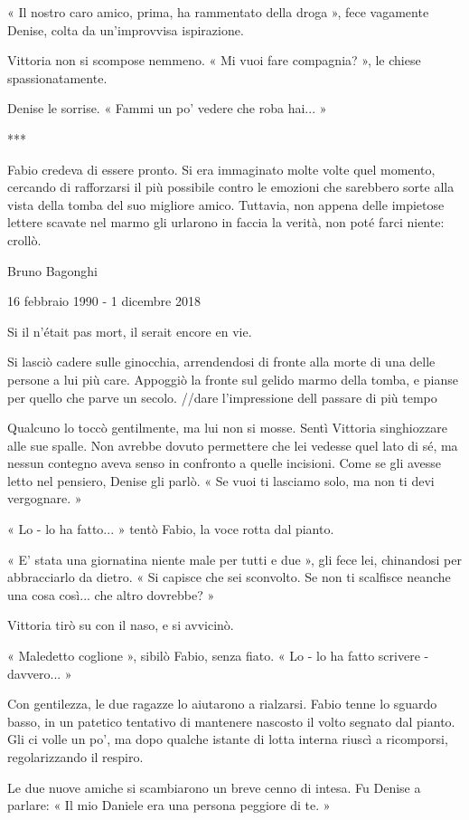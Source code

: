 « Il nostro caro amico, prima, ha rammentato della droga », fece vagamente Denise, colta da un'improvvisa ispirazione.

Vittoria non si scompose nemmeno. « Mi vuoi fare compagnia? », le chiese spassionatamente.

Denise le sorrise. « Fammi un po' vedere che roba hai... »

***

Fabio credeva di essere pronto. Si era immaginato molte volte quel momento, cercando di rafforzarsi il più possibile contro le emozioni che sarebbero sorte alla vista della tomba del suo migliore amico. Tuttavia, non appena delle impietose lettere scavate nel marmo gli urlarono in faccia la verità, non poté farci niente: crollò.

Bruno Bagonghi

16 febbraio 1990 - 1 dicembre 2018

Si il n'était pas mort, il serait encore en vie.

Si lasciò cadere sulle ginocchia, arrendendosi di fronte alla morte di una delle persone a lui più care. Appoggiò la fronte sul gelido marmo della tomba, e pianse per quello che parve un secolo. //dare l'impressione dell passare di più tempo

Qualcuno lo toccò gentilmente, ma lui non si mosse. Sentì Vittoria singhiozzare alle sue spalle. Non avrebbe dovuto permettere che lei vedesse quel lato di sé, ma nessun contegno aveva senso in confronto a quelle incisioni. Come se gli avesse letto nel pensiero, Denise gli parlò. « Se vuoi ti lasciamo solo, ma non ti devi vergognare. »

« Lo - lo ha fatto... » tentò Fabio, la voce rotta dal pianto.

« E' stata una giornatina niente male per tutti e due », gli fece lei, chinandosi per abbracciarlo da dietro. « Si capisce che sei sconvolto. Se non ti scalfisce neanche una cosa così... che altro dovrebbe? »

Vittoria tirò su con il naso, e si avvicinò.

« Maledetto coglione », sibilò Fabio, senza fiato. « Lo - lo ha fatto scrivere - davvero... »

Con gentilezza, le due ragazze lo aiutarono a rialzarsi. Fabio tenne lo sguardo basso, in un patetico tentativo di mantenere nascosto il volto segnato dal pianto. Gli ci volle un po', ma dopo qualche istante di lotta interna riuscì a ricomporsi, regolarizzando il respiro.

Le due nuove amiche si scambiarono un breve cenno di intesa. Fu Denise a parlare: « Il mio Daniele era una persona peggiore di te. »

